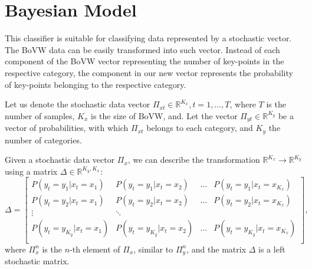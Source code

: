 \section{Bayesian Model}
This classifier is suitable for classifying data represented by a stochastic vector. The BoVW data can be easily transformed into such vector. Instead of each component of the BoVW vector representing the number of key-points in the respective category, the component in our new vector represents the probability of key-points belonging to the respective category.

Let us denote the stochastic data vector $\Pi_{xt} \in \mathbb{R}^{K_x}, t=1,\dots,T$, where $T$ is the number of samples, $K_x$ is the size of BoVW, and. Let the vector $\Pi_{yt}\in \mathbb{R}^{K_y}$ be a vector of probabilities, with which $\Pi_{xt}$ belongs to each category, and $K_y$ the number of categories.

Given a stochastic data vector $\Pi_x$, we can describe the transformation $\mathbb{R}^{K_x} \rightarrow \mathbb{R}^{K_y}$ using a matrix $\Delta \in \mathbb{R}^{K_y, K_x}$:
\begin{equation}
    \Delta =
    \begin{bmatrix}
        P(y_t = y_1 | x_t = x_1) & P(y_t = y_1 | x_t = x_2) & \dots & P(y_t = y_1 | x_t = x_{K_x})\\
        P(y_t = y_2 | x_t = x_1) & P(y_t = y_2 | x_t = x_2) & \dots & P(y_t = y_2 | x_t = x_{K_x})\\
        \vdots & \ddots\\
        P(y_t = y_{K_y} | x_t = x_1) & P(y_t = y_{K_y} | x_t = x_2) & \dots & P(y_t = y_{K_y} | x_t = x_{K_x})\\
    \end{bmatrix},
\end{equation}
where $\Pi_x^n$ is the $n$-th element of $\Pi_x$, similar to $\Pi_y^n$, and the matrix $\Delta$ is a left stochastic matrix.

